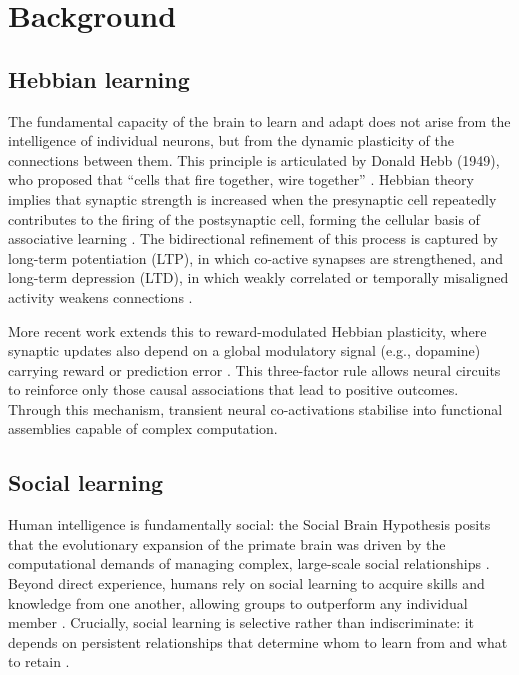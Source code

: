 \section{Background}
\label{background}

\subsection*{Hebbian learning}
The fundamental capacity of the brain to learn and adapt does not arise from the intelligence of individual neurons, but from the dynamic plasticity of the connections between them. This principle is articulated by Donald Hebb (1949), who proposed that ``cells that fire together, wire together'' \cite{hebb2005organization}. Hebbian theory implies that synaptic strength is increased when the presynaptic cell repeatedly contributes to the firing of the postsynaptic cell, forming the cellular basis of associative learning \cite{brown2020donald, lazari2022hebbian}. The bidirectional refinement of this process is captured by long-term potentiation (LTP), in which co-active synapses are strengthened, and long-term depression (LTD), in which weakly correlated or temporally misaligned activity weakens connections \cite{lazari2022hebbian}.

More recent work extends this to reward-modulated Hebbian plasticity, where synaptic updates also depend on a global modulatory signal (e.g., dopamine) carrying reward or prediction error \cite{kusmierz2017learning}. This three-factor rule allows neural circuits to reinforce only those causal associations that lead to positive outcomes. Through this mechanism, transient neural co-activations stabilise into functional assemblies capable of complex computation.

\subsection*{Social learning}
Human intelligence is fundamentally social: the Social Brain Hypothesis posits that the evolutionary expansion of the primate brain was driven by the computational demands of managing complex, large-scale social relationships \cite{dunbar1998social}. Beyond direct experience, humans rely on social learning to acquire skills and knowledge from one another, allowing groups to outperform any individual member \cite{tomasello1993cultural, boyd2011cultural}. Crucially, social learning is selective rather than indiscriminate: it depends on persistent relationships that determine whom to learn from and what to retain \cite{kendal2018social}.


